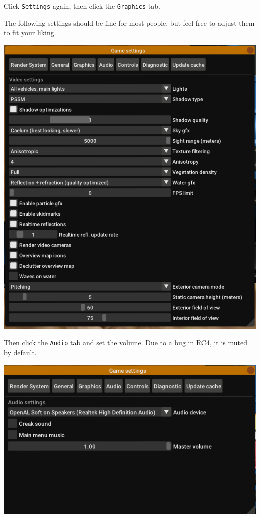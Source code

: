 Click \texttt{Settings} again, then click the \texttt{Graphics} tab.

The following settings should be fine for most people, but feel free to
adjust them to fit your liking.

\includegraphics{images/bg-firstrun5.png}

Then click the \texttt{Audio} tab and set the volume. Due to a bug in
RC4, it is muted by default.

\includegraphics{images/bg-firstrun6.png}

